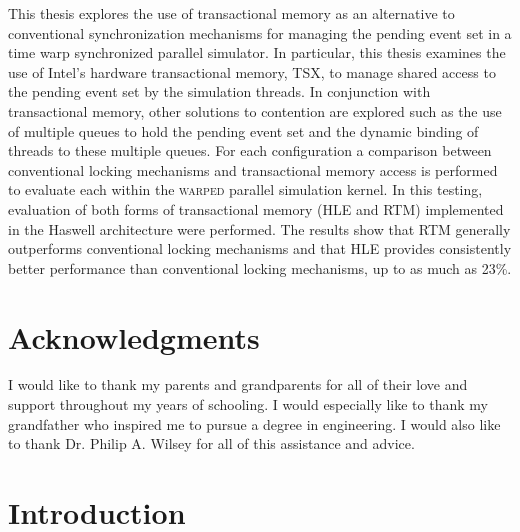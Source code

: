 \documentclass[11pt]{book}
\begin{document}
This thesis explores the use of transactional memory as an alternative to
conventional synchronization mechanisms for managing the pending event set in a
time warp synchronized parallel simulator.  In particular, this thesis examines
the use of Intel's hardware transactional memory, TSX, to manage shared access
to the pending event set by the simulation threads.  In conjunction with
transactional memory, other solutions to contention are explored such as the use
of multiple queues to hold the pending event set and the dynamic binding of
threads to these multiple queues.  For each configuration a comparison between
conventional locking mechanisms and transactional memory access is performed to
evaluate each within the \textsc{warped} parallel simulation kernel.  In this
testing, evaluation of both forms of transactional memory (HLE and RTM)
implemented in the Haswell architecture were performed.  The results show that
RTM generally outperforms  conventional locking mechanisms and that HLE provides
consistently better performance than conventional locking mechanisms, up to as
much as 23\%.


\chapter*{Acknowledgments} 

I would like to thank my parents and grandparents for all of their love and
support throughout my years of schooling.  I would especially like to thank my
grandfather who inspired me to pursue a degree in engineering.  I would also
like to thank Dr. Philip A. Wilsey for all of this assistance and advice.

\tableofcontents \markright{ }
\listoffigures \markright{ }
\listoftables \markright{ }

\clearpage
{} \setcounter{page}{1}

\chapter{Introduction}\label{intro} 
\end{document}
